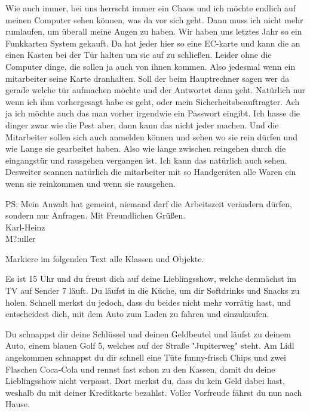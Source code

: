         Wie auch immer, bei uns herrscht immer ein Chaos und ich möchte endlich auf meinen Computer sehen können, was da vor sich geht. Dann muss ich nicht mehr rumlaufen, um überall meine Augen zu haben.
        Wir haben uns letztes Jahr so ein Funkkarten System gekauft. Da hat jeder hier so eine EC-karte und kann die an einen Kasten bei der Tür halten um sie auf zu schließen. Leider ohne die Computer dinge, die sollen ja auch von ihnen kommen. Also jedesmal wenn ein mitarbeiter seine Karte dranhalten. Soll der beim Hauptrechner sagen wer da gerade welche tür aufmachen möchte und der Antwortet dann geht. Natürlich nur wenn ich ihm vorhergesagt habe es geht, oder mein Sicherheitsbeauftragter. Ach ja ich möchte auch das man vorher irgendwie ein Passwort eingibt. Ich hasse die dinger zwar wie die Pest aber, dann kann das nicht jeder machen. 
        Und die Mitarbeiter sollen sich auch anmelden können und sehen wo sie rein dürfen und wie Lange sie gearbeitet haben. Also wie lange zwischen reingehen durch die eingangstür und rausgehen vergangen ist. Ich kann das natürlich auch sehen.\\
        Desweiter scannen natürlich die mitarbeiter mit so Handgeräten alle Waren ein wenn sie reinkommen und wenn sie rausgehen.
        \medskip
        
        PS: Mein Anwalt hat gemeint, niemand darf die Arbeitszeit verändern dürfen, sondern nur Anfragen.
        \medskip
        Mit Freundlichen Grüßen.\\Karl-Heinz\\ M?:uller
        
        \subexcercise 
        Markiere im folgenden Text alle Klassen und Objekte.
        
        Es ist 15 Uhr und du freust dich auf deine Lieblingsshow, welche demnächst im TV auf Sender 7 läuft. 
        Du läufst in die Küche, um dir Softdrinks und Snacks zu holen. Schnell merkst du jedoch, dass du beides nicht mehr vorrätig hast, und entscheidest dich, mit dem Auto zum Laden zu fahren und einzukaufen.
        
        Du schnappst dir deine Schlüssel und deinen Geldbeutel und läufst zu deinem Auto, einem blauen Golf 5, welches auf der Straße "Jupiterweg" steht. 
        Am Lidl angekommen schnappst du dir schnell eine Tüte funny-frisch Chips und zwei Flaschen Coca-Cola und rennst fast schon zu den Kassen, damit du deine Lieblingsshow nicht verpasst. Dort merkst du, dass du kein Geld dabei hast, weshalb du mit deiner Kreditkarte bezahlst. Voller Vorfreude fährst du nun nach Hause. 
        